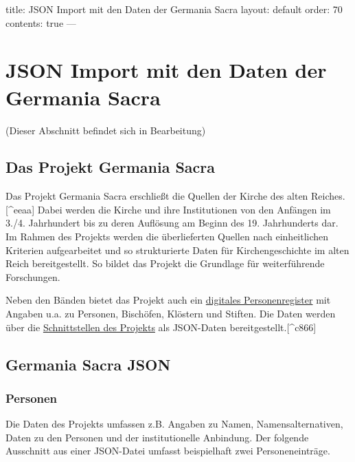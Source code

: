 \documentclass[12pt,ngerman,]{article}
\begin{document}
title: JSON Import mit den Daten der Germania Sacra layout: default
order: 70 contents: true ---

\section{JSON Import mit den Daten der Germania
Sacra}\label{json-import-mit-den-daten-der-germania-sacra}

(Dieser Abschnitt befindet sich in Bearbeitung)

\subsection{Das Projekt Germania
Sacra}\label{das-projekt-germania-sacra}

Das Projekt Germania Sacra erschließt die Quellen der Kirche des alten
Reiches.{[}\^{}eeaa{]} Dabei werden die Kirche und ihre Institutionen
von den Anfängen im 3./4. Jahrhundert bis zu deren Auflösung am Beginn
des 19. Jahrhunderts dar. Im Rahmen des Projekts werden die
überlieferten Quellen nach einheitlichen Kriterien aufgearbeitet und so
strukturierte Daten für Kirchengeschichte im alten Reich bereitgestellt.
So bildet das Projekt die Grundlage für weiterführende Forschungen.

Neben den Bänden bietet das Projekt auch ein
\href{https://adw-goe.de/forschung/forschungsprojekte-akademienprogramm/germania-sacra/digitales-personenregister/}{digitales
Personenregister} mit Angaben u.a. zu Personen, Bischöfen, Klöstern und
Stiften. Die Daten werden über die
\href{https://adw-goe.de/forschung/forschungsprojekte-akademienprogramm/germania-sacra/schnittstellen-und-linked-data/}{Schnittstellen
des Projekts} als JSON-Daten bereitgestellt.{[}\^{}c866{]}

\subsection{Germania Sacra JSON}\label{germania-sacra-json}

\subsubsection{Personen}\label{personen}

Die Daten des Projekts umfassen z.B. Angaben zu Namen,
Namensalternativen, Daten zu den Personen und der institutionelle
Anbindung. Der folgende Ausschnitt aus einer JSON-Datei umfasst
beispielhaft zwei Personeneinträge.
\end{document}
